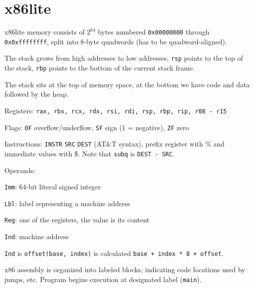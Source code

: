 \section*{x86lite}

x86lite memory consists of $2^{64}$ bytes numbered \texttt{0x00000000} through \texttt{0x0xffffffff}, split into 8-byte quadwords (has to be quadword-aligned). \medskip
	
The stack grows from high addresses to low addresses, \texttt{rsp} points to the top of the stack, \texttt{rbp} points to the bottom of the current stack frame. \medskip

The stack sits at the top of memory space, at the bottom we have code and data followed by the heap.\medskip
	
Registers: \texttt{rax, rbx, rcx, rdx, rsi, rdi, rsp, rbp, rip, r08 - r15} \medskip
	
Flags: \texttt{OF} overflow/underflow, \texttt{SF} sign (1 = negative), \texttt{ZF} zero \medskip
	
Instructions: \texttt{INSTR} \texttt{SRC} \texttt{DEST} (AT\&T syntax), prefix register with \% and immediate values with \$. Note that \texttt{subq} is \texttt{DEST - SRC}.\medskip
	
Operands:
\begin{compactitem}
	\item \texttt{Imm}: 64-bit literal signed integer
	\item \texttt{Lbl}: label representing a machine address
	\item \texttt{Reg}: one of the registers, the value is its content
	\item \texttt{Ind}: machine address
\end{compactitem} \medskip

\texttt{Ind} is  \texttt{offset(base, index)} is calculated \texttt{base + index * 8 + offset}.\medskip
	
x86 assembly is organized into labeled blocks, indicating code locations used by jumps, etc. Program begins execution at designated label (\texttt{main}).\medskip
	
